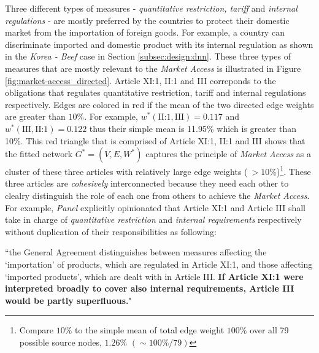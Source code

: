 Three different types of measures - \textit{quantitative restriction, tariff} and \textit{internal regulations} - are mostly preferred by the countries to protect their domestic market from the importation of foreign goods. For example, a country can
discriminate imported and domestic product with its internal regulation as shown in the \textit{Korea - Beef} case in Section \ref{subsec:design:dnn}.
These three types of measures that are mostly relevant to the \textit{Market Access} is illustrated in Figure \ref{fig:market-aceess_directed}.
Article XI:1, II:1 and III correponds to the obligations that regulates quantitative restriction, tariff and internal regulations respectively.
Edges are colored in red if the mean of the two directed edge weights are greater than $10\%$. For example, $w^*(\text{II:1}, \text{III}) = 0.117$ and $w^*(\text{III}, \text{II:1}) = 0.122$ thus their simple mean is 11.95\% which is greater than 10\%.
This red triangle that is comprised of Article XI:1, II:1 and III shows that the fitted network $G^* = (V, E, W^*)$ captures the principle of \textit{Market Access} as a cluster of these three articles with relatively large edge weights ($\: >10\%$)\footnote{Compare $10\%$ to the simple mean of total edge weight $100\%$ over all 79 possible source nodes, $1.26\%$ $(\sim 100\% / 79)$}.
These three articles are \textit{cohesively} interconnected because they need each other to clealry distinguish the role of each one from others to achieve the \textit{Market Access}.
For example, \textit{Panel} explicitly opinionated that Article XI:1 and Article III shall take in charge of \textit{quantitative restriction} and \textit{internal requirements} respectively without duplication of their responsibilities as following: 

\begin{displayquote}[][]
``the General Agreement distinguishes between measures affecting the `importation' of products,
which are regulated in Article XI:1, and those affecting `imported products', which are dealt with in
Article III. \textbf{If Article XI:1 were interpreted broadly to cover also internal requirements, Article III
would be partly superfluous.}"
\end{displayquote}

